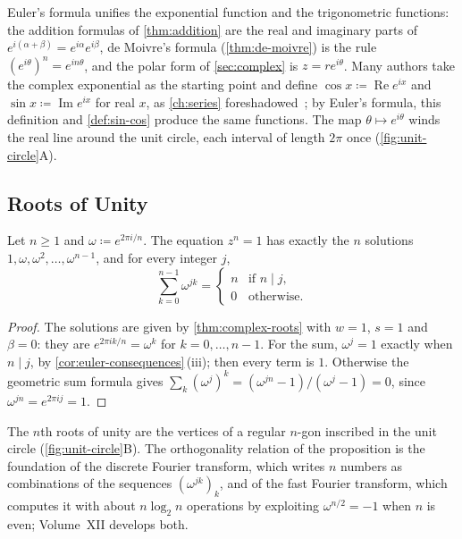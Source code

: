 Euler's formula unifies the exponential function and the trigonometric functions: the addition formulas of \cref{thm:addition} are the real and imaginary parts of $e^{i(\alpha+\beta)}=e^{i\alpha}e^{i\beta}$, de Moivre's formula (\cref{thm:de-moivre}) is the rule $(e^{i\theta})^n=e^{in\theta}$, and the polar form of \cref{sec:complex} is $z=re^{i\theta}$. Many authors take the complex exponential as the starting point and define $\cos x\coloneqq\operatorname{Re}e^{ix}$ and $\sin x\coloneqq\operatorname{Im}e^{ix}$ for real $x$, as \cref{ch:series} foreshadowed~\cite{rudin1976}; by Euler's formula, this definition and \cref{def:sin-cos} produce the same functions. The map $\theta\mapsto e^{i\theta}$ winds the real line around the unit circle, each interval of length $2\pi$ once (\cref{fig:unit-circle}A).

\subsection{Roots of Unity}

\begin{proposition}
\label{prop:roots-of-unity}
Let $n\ge1$ and $\omega\coloneqq e^{2\pi i/n}$. The equation $z^n=1$ has exactly the $n$ solutions $1,\omega,\omega^2,\ldots,\omega^{n-1}$, and for every integer $j$,
\[
\sum_{k=0}^{n-1}\omega^{jk}=\begin{cases}n&\text{if }n\mid j,\\0&\text{otherwise.}\end{cases}
\]
\end{proposition}

\begin{proof}
The solutions are given by \cref{thm:complex-roots} with $w=1$, $s=1$ and $\beta=0$: they are $e^{2\pi ik/n}=\omega^k$ for $k=0,\ldots,n-1$. For the sum, $\omega^j=1$ exactly when $n\mid j$, by \cref{cor:euler-consequences}\,(iii); then every term is $1$. Otherwise the geometric sum formula gives $\sum_k(\omega^j)^k=(\omega^{jn}-1)/(\omega^j-1)=0$, since $\omega^{jn}=e^{2\pi ij}=1$.
\end{proof}

The $n$th roots of unity are the vertices of a regular $n$-gon inscribed in the unit circle (\cref{fig:unit-circle}B). The orthogonality relation of the proposition is the foundation of the discrete Fourier transform, which writes $n$ numbers as combinations of the sequences $(\omega^{jk})_k$, and of the fast Fourier transform, which computes it with about $n\log_2n$ operations by exploiting $\omega^{n/2}=-1$ when $n$ is even; Volume~XII develops both.


